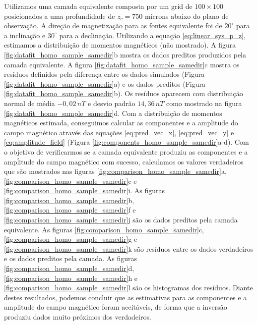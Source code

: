 Utilizamos uma camada equivalente composta por um grid de $100 \times 100$ posicionados a uma profundidade de $z_c = 750$ microns abaixo do plano de observação. A direção de magnetização para as fontes equivalente foi de $20^\circ$ para a inclinação e $30^\circ$ para a declinação. Utilizando a equação \ref{eq:linear_sys_p_z}, estimamos a distribuição de momentos magnéticos (não mostrado). A figura \ref{fig:datafit_homo_sample_samedir}b mostra os dados preditos produzidos pela camada equivalente. A figura \ref{fig:datafit_homo_sample_samedir}c mostra os resíduos definidos pela diferença entre os dados simulados (Figura \ref{fig:datafit_homo_sample_samedir}a) e os dados preditos (Figura \ref{fig:datafit_homo_sample_samedir}b). Os resíduos aparecem com distribuição normal de média $-0,02 \, nT$ e desvio padrão $14,36 \, nT$ como mostrado na figura \ref{fig:datafit_homo_sample_samedir}d. Com a distribuição de momentos magnéticos estimada, conseguimos calcular as componentes e a amplitude do campo magnético através das equações \ref{eq:pred_vec_x}, \ref{eq:pred_vec_y} e \ref{eq:amplitude_field} (Figura \ref{fig:components_homo_sample_samedir}a-d). Com o objetivo de verificarmos se a camada equivalente produziu as componentes e a ampĺitude do campo magnético com sucesso, calculamos os valores verdadeiros que são mostrados nas  figuras \ref{fig:comparison_homo_sample_samedir}a, \ref{fig:comparison_homo_sample_samedir}e e \ref{fig:comparison_homo_sample_samedir}i. As figuras \ref{fig:comparison_homo_sample_samedir}b, \ref{fig:comparison_homo_sample_samedir}f e \ref{fig:comparison_homo_sample_samedir}j são os dados preditos pela camada equivalente. As figuras \ref{fig:comparison_homo_sample_samedir}c, \ref{fig:comparison_homo_sample_samedir}g e \ref{fig:comparison_homo_sample_samedir}k são resíduos entre os dados verdadeiros e os dados preditos pela camada. As figuras \ref{fig:comparison_homo_sample_samedir}d, \ref{fig:comparison_homo_sample_samedir}h e \ref{fig:comparison_homo_sample_samedir}l são os histogramas dos resíduos. Diante destes resultados, podemos concluir que as estimativas para as componentes e a amplitude do campo magnético foram aceitáveis, de forma que a inversão produziu dados muito próximos dos verdadeiros.  


